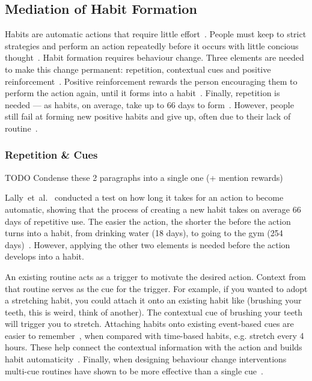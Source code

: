 \documentclass{scaffold/sigchi}
\begin{document}
\subsection{Mediation of Habit Formation}
Habits are automatic actions that require little effort~\cite{article_the_habitual_consumer}. People must keep to strict strategies and perform an action repeatedly before it occurs with little concious thought~\cite{article_promoting_habit_formation}. Habit formation requires behaviour change. Three elements are needed to make this change permanent: repetition, contextual cues and positive reinforcement~\cite{article_experiences_of_habit_formation}. Positive reinforcement rewards the person encouraging them to perform the action again, until it forms into a habit~\cite{}. Finally, repetition is needed --- as habits, on average, take up to 66 days to form~\cite{article_how_habits_formed_modelling_habit_formation}.
However, people still fail at forming new positive habits and give up, often due to their lack of routine~\cite{article_promoting_habit_formation, article_the_habitual_consumer}.

\subsubsection{Repetition \& Cues}
TODO Condense these 2 paragraphs into a single one (+ mention rewards)


Lally~et~al.~\cite{article_how_habits_formed_modelling_habit_formation} conducted a test on how long it takes for an action to become automatic, showing that the process of creating a new habit takes on average 66 days of repetitive use. The easier the action, the shorter the before the action turns into a habit, from drinking water (18 days), to going to the gym (254 days)~\cite{article_how_habits_formed_modelling_habit_formation}. However, applying the other two elements is needed before the action develops into a habit.


An existing routine acts as a trigger to motivate the desired action. Context from that routine serves as the cue for the trigger. For example, if you wanted to adopt a stretching habit, you could attach it onto an existing habit like (brushing your teeth, this is weird, think of another). The contextual cue of brushing your teeth will trigger you to stretch. Attaching habits onto existing event-based cues are easier to remember~\cite{article_implementation_intentions_multicue}, when compared with time-based habits, e.g. stretch every 4 hours. These help connect the contextual information with the action and builds habit automaticity~\cite{article_implementation_intentions}. Finally, when designing behaviour change interventions multi-cue routines have shown to be more effective than a single cue~\cite{article_understanding_use_contextual_cues_design_impl}.
\end{document}
